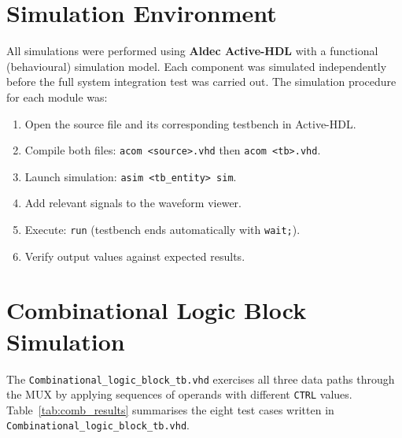 \documentclass[12pt, a4paper]{report}
\begin{document}
\section{Simulation Environment}

All simulations were performed using \textbf{Aldec Active-HDL} with a functional
(behavioural) simulation model. Each component was simulated independently before
the full system integration test was carried out. The simulation procedure for each
module was:

\begin{enumerate}
  \item Open the source file and its corresponding testbench in Active-HDL.
  \item Compile both files: \texttt{acom <source>.vhd} then \texttt{acom <tb>.vhd}.
  \item Launch simulation: \texttt{asim <tb\_entity> sim}.
  \item Add relevant signals to the waveform viewer.
  \item Execute: \texttt{run} (testbench ends automatically with \texttt{wait;}).
  \item Verify output values against expected results.
\end{enumerate}


\section{Combinational Logic Block Simulation}

The \texttt{Combinational\_logic\_block\_tb.vhd} exercises all three
data paths through the MUX by applying sequences of operands with different
\texttt{CTRL} values. Table~\ref{tab:comb_results} summarises the eight test cases written in \texttt{Combinational\_logic\_block\_tb.vhd}.
\end{document}
